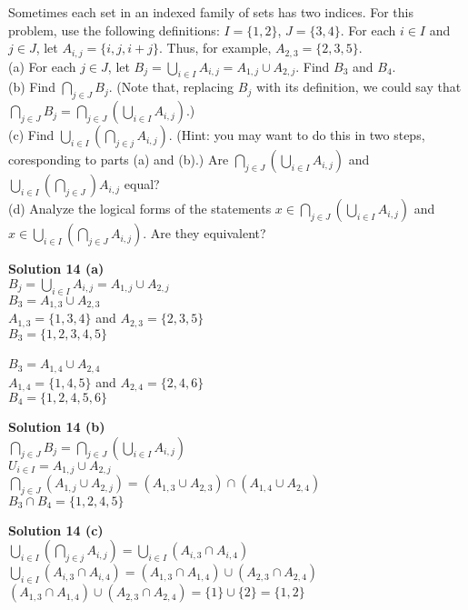 \begin{tcolorbox}[title=Problem 14, breakable]
    Sometimes each set in an indexed family of sets has two indices. For this problem,
    use the following definitions: $I = \{1, 2\}$, $J = \{3, 4\}$. For each
    $i \in I$ and $j \in J$, let $A_{i, j} = \{i, j, i + j\}$. Thus, for example,
    $A_{2, 3} = \{2, 3, 5\}$. \\
    (a) For each $j \in J$, let $B_j = \bigcup_{i \in I}A_{i, j} = A_{1, j} \cup A_{2, j}$. Find 
        $B_3$ and $B_4$. \\
    (b) Find $\bigcap_{j \in J} B_j$. (Note that, replacing $B_j$ with its definition, we could say that
        $\bigcap_{j \in J}B_j = \bigcap_{j \in J}(\bigcup_{i \in I} A_{i, j})$.)  \\
    (c) Find $\bigcup_{i \in I}(\bigcap_{j \in j} A_{i, j})$. (Hint: you may want to do this in two
        steps, coresponding to parts (a) and (b).) Are $\bigcap_{j \in J}(\bigcup_{i \in I} A_{i, j})$
        and $\bigcup_{i \in I}(\bigcap_{j \in J}) A_{i, j}$ equal? \\
    (d) Analyze the logical forms of the statements $x \in \bigcap_{j \in J}(\bigcup_{i \in I} A_{i, j})$ and 
        $x \in \bigcup_{i \in I}(\bigcap_{j \in J} A_{i, j})$. Are they equivalent?
\end{tcolorbox}

\textbf{Solution 14 (a)} \\
$B_j = \bigcup_{i \in I} A_{i, j} = A_{1, j} \cup A_{2, j}$ \\
$B_3 = A_{1, 3} \cup A_{2, 3}$ \\
$A_{1, 3} = \{1, 3, 4\}$ and
$A_{2, 3} = \{2, 3, 5\}$ \\
$B_3 = \{1, 2, 3, 4, 5\}$ \\ \\
$B_3 = A_{1, 4} \cup A_{2, 4}$ \\
$A_{1, 4} = \{1, 4, 5\}$ and
$A_{2, 4} = \{2, 4, 6\}$ \\
$B_4 = \{1, 2, 4, 5, 6\}$

\textbf{Solution 14 (b)} \\
$\bigcap_{j \in J} B_j = \bigcap_{j \in J}(\bigcup_{i \in I} A_{i, j})$ \\
$U_{i \in I} = A_{1, j} \cup A_{2, j}$ \\
$\bigcap_{j \in J}(A_{1, j} \cup A_{2, j}) = (A_{1, 3} \cup A_{2, 3}) \cap (A_{1, 4} \cup A_{2, 4})$ \\
$B_3 \cap B_4 = \{1, 2, 4, 5\}$

\textbf{Solution 14 (c)} \\
$\bigcup_{i \in I}(\bigcap_{j \in j} A_{i, j}) = \bigcup_{i \in I}(A_{i, 3} \cap A_{i, 4})$ \\
$\bigcup_{i \in I}(A_{i, 3} \cap A_{i, 4}) = (A_{1, 3} \cap A_{1, 4}) \cup (A_{2, 3} \cap A_{2, 4})$ \\
$(A_{1, 3} \cap A_{1, 4}) \cup (A_{2, 3} \cap A_{2, 4}) = \{1\} \cup \{2\} = \{1, 2\}$


